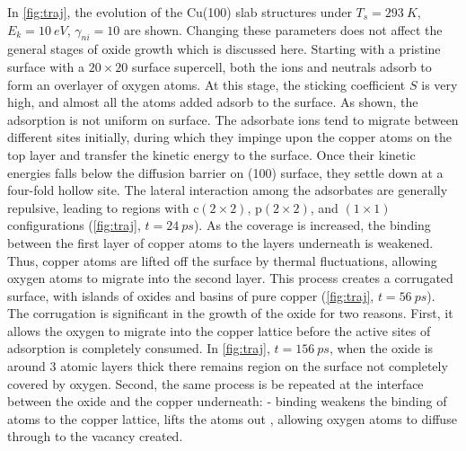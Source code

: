 \documentclass[manuscript=cmatex]{achemso}
\begin{document}
In \cref{fig:traj}, the evolution of the Cu(100) slab structures under $T_s=\SI{293}{K}$, $E_k=\SI{10}{eV}$, $\gamma_{ni}=10$ are shown. Changing these parameters does not affect the general stages of oxide growth which is discussed here. Starting with a pristine surface with a $20\times20$ surface supercell, both the ions and neutrals adsorb to form an overlayer of oxygen atoms. At this stage, the sticking coefficient $S$ is very high, and almost all the atoms added adsorb to the surface. As shown, the adsorption is not uniform on surface. The adsorbate ions tend to migrate between different sites initially, during which they impinge upon the copper atoms on the top layer and transfer the kinetic energy to the surface. Once their kinetic energies falls below the diffusion barrier on (100) surface, they settle down at a four-fold hollow site. The lateral interaction among the adsorbates are generally repulsive, leading to regions with c$(2\times2)$, p$(2\times2)$, and $(1\times1)$ configurations (\cref{fig:traj}, $t=\SI{24}{ps}$). As the coverage is increased, the binding between the first layer of copper atoms to the layers underneath is weakened. Thus, copper atoms are lifted off the surface by thermal fluctuations, allowing oxygen atoms to migrate into the second layer. This process creates a corrugated surface, with islands of oxides and basins of pure copper (\cref{fig:traj}, $t=\SI{56}{ps}$). The corrugation is significant in the growth of the oxide for two reasons. First, it allows the oxygen to migrate into the copper lattice before the active sites of adsorption is completely consumed. In \cref{fig:traj}, $t=\SI{156}{ps}$, when the oxide is around 3 atomic layers thick there remains region on the surface not completely covered by oxygen. Second, the same process is be repeated at the interface between the oxide and the copper underneath: - binding weakens the binding of  atoms to the copper lattice, lifts the  atoms out , allowing oxygen atoms to diffuse through to the vacancy created.
\end{document}
